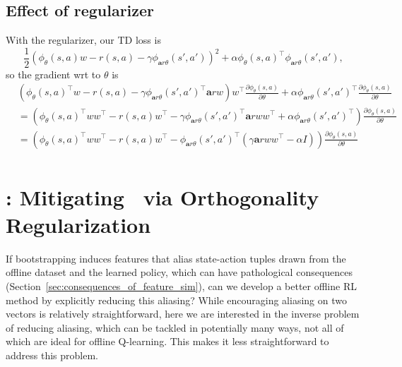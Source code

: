 \subsection{Effect of regularizer}
With the regularizer, our TD loss is
\[ \frac{1}{2}\left(\phi_\theta(s, a)w - r(s, a) - \gamma\phi_{\mathbf{a}r{\theta}}(s', a')\right)^2 + \alpha \phi_\theta(s, a)^\top \phi_{\mathbf{a}r{\theta}}(s', a'),\]
so the gradient wrt to $\theta$ is
\begin{align*}
  &\left(\phi_\theta(s, a)^\top w - r(s, a) - \gamma\phi_{\mathbf{a}r{\theta}}(s', a')^\top \mathbf{a}r{w} \right)w^\top\frac{\partial \phi_\theta(s, a)}{\partial \theta} + \alpha \phi_{\mathbf{a}r{\theta}}(s', a')^\top\frac{\partial \phi_\theta(s, a)}{\partial \theta}\\
  &=\left(\phi_\theta(s, a)^\top ww^\top - r(s, a)w^\top - \gamma\phi_{\mathbf{a}r{\theta}}(s', a')^\top \mathbf{a}r{w}w^\top + \alpha\phi_{\mathbf{a}r{\theta}}(s', a')^\top \right)\frac{\partial \phi_\theta(s, a)}{\partial \theta} \\ 
  &=\left(\phi_\theta(s, a)^\top ww^\top - r(s, a)w^\top - \phi_{\mathbf{a}r{\theta}}(s', a')^\top \left(\gamma\mathbf{a}r{w}w^\top - \alpha I \right)\right)\frac{\partial \phi_\theta(s, a)}{\partial \theta} \\ 
\end{align*}
\fi


\iffalse
\section{\drmethodname: Mitigating \AliasingProblemName\ via Orthogonality Regularization}
\label{sec:method}


If bootstrapping induces features that alias state-action tuples drawn from the offline dataset and the learned policy, which can have pathological consequences (Section~\ref{sec:consequences_of_feature_sim}), can we develop a better offline RL method by explicitly reducing this aliasing? While encouraging aliasing on two vectors is relatively straightforward, here we are interested in the inverse problem of reducing aliasing, which can be tackled in potentially many ways, not all of which are ideal for offline Q-learning. This makes it less straightforward to address this problem.

